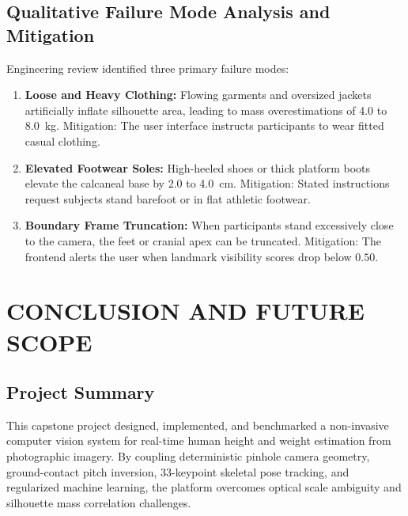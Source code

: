 \documentclass[12pt,a4paper,oneside]{report}
\begin{document}
\section{Qualitative Failure Mode Analysis and Mitigation}
Engineering review identified three primary failure modes:
\begin{enumerate}[label=\arabic*.]
    \item \textbf{Loose and Heavy Clothing:} Flowing garments and oversized jackets artificially inflate silhouette area, leading to mass overestimations of 4.0 to 8.0~kg. Mitigation: The user interface instructs participants to wear fitted casual clothing.
    \item \textbf{Elevated Footwear Soles:} High-heeled shoes or thick platform boots elevate the calcaneal base by 2.0 to 4.0~cm. Mitigation: Stated instructions request subjects stand barefoot or in flat athletic footwear.
    \item \textbf{Boundary Frame Truncation:} When participants stand excessively close to the camera, the feet or cranial apex can be truncated. Mitigation: The frontend alerts the user when landmark visibility scores drop below $0.50$.
\end{enumerate}

\chapter{CONCLUSION AND FUTURE SCOPE}

\section{Project Summary}
This capstone project designed, implemented, and benchmarked a non-invasive computer vision system for real-time human height and weight estimation from photographic imagery. By coupling deterministic pinhole camera geometry, ground-contact pitch inversion, 33-keypoint skeletal pose tracking, and regularized machine learning, the platform overcomes optical scale ambiguity and silhouette mass correlation challenges.
\end{document}
